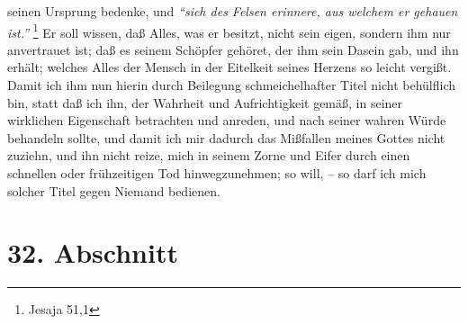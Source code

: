seinen Ursprung bedenke, und
\textit{"`sich des Felsen erinnere, aus welchem er gehauen
ist."'}
\footnote{Jesaja 51,1}
Er soll wissen, daß Alles, was er besitzt, nicht sein
eigen, sondern ihm nur anvertrauet ist; daß es seinem Schöpfer gehöret, der ihm
sein Dasein gab, und ihn erhält; welches Alles der Mensch in der Eitelkeit
seines Herzens so leicht vergißt. Damit ich ihm nun hierin durch Beilegung
schmeichelhafter Titel nicht behülflich bin, statt daß ich ihn, der Wahrheit und
Aufrichtigkeit gemäß, in seiner wirklichen Eigenschaft betrachten und anreden,
und nach seiner wahren Würde behandeln sollte, und damit ich mir dadurch das
Mißfallen meines Gottes nicht zuziehn, und ihn nicht reize, mich in seinem Zorne
und Eifer durch einen schnellen oder frühzeitigen Tod hinwegzunehmen; so will,
-- so darf ich mich solcher Titel gegen Niemand bedienen.

\section{32. Abschnitt} \label{kap9_ab32}

